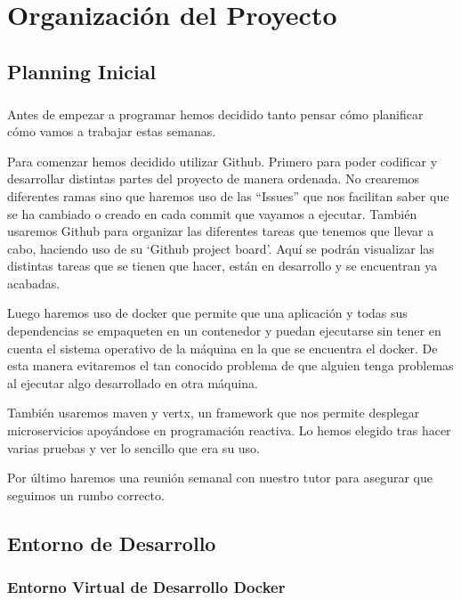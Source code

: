 \chapter{Organización del Proyecto}

\paragraph{}
\section{Planning Inicial}
\paragraph{}
Antes de empezar a programar hemos decidido tanto pensar cómo planificar cómo vamos a trabajar estas semanas.

Para comenzar hemos decidido utilizar Github. Primero para poder codificar y desarrollar distintas partes del proyecto de manera ordenada. No crearemos diferentes ramas sino que haremos uso de las “Issues” que nos facilitan saber que se ha cambiado o creado en cada commit que vayamos a ejecutar. También usaremos Github para organizar las diferentes tareas que tenemos que llevar a cabo, haciendo uso de su ‘Github project board’. Aquí se podrán visualizar las distintas tareas que se tienen que hacer, están en desarrollo y se encuentran ya acabadas.

Luego haremos uso de docker que permite que una aplicación y todas sus dependencias se empaqueten en un contenedor y puedan ejecutarse sin tener en cuenta el sistema operativo de la máquina en la que se encuentra el docker. De esta manera evitaremos el tan conocido problema de que alguien tenga problemas al ejecutar algo desarrollado en otra máquina.

También usaremos maven y vertx, un framework  que nos permite desplegar microservicios apoyándose en programación reactiva. Lo hemos elegido tras hacer varias pruebas y ver lo sencillo que era su uso.

Por último haremos una reunión semanal con nuestro tutor para asegurar que seguimos un rumbo correcto.

\section{Entorno de Desarrollo}

\subsection{Entorno Virtual de Desarrollo Docker}

